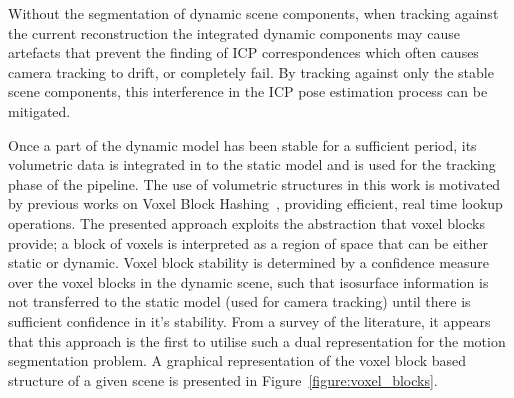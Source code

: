Without the segmentation of dynamic scene components, when tracking against the
current reconstruction the integrated dynamic components may cause artefacts
that prevent the finding of ICP correspondences which often causes camera
tracking to drift, or completely fail. By tracking against only the stable
scene components, this interference in the ICP pose estimation process can be
mitigated.

Once a part of the dynamic model has been stable for a sufficient period, its
volumetric data is integrated in to the static model and is used for the
tracking phase of the pipeline. The use of volumetric structures in this work
is motivated by previous works on Voxel Block Hashing~\cite{NieBner2013},
providing efficient, real time lookup operations. The presented approach
exploits the abstraction that voxel blocks provide; a block of voxels is
interpreted as a region of space that can be either static or dynamic.
Voxel block stability is determined by a confidence measure over the voxel
blocks in the dynamic scene, such that isosurface information is not transferred
to the static model (used for camera tracking) until there is sufficient
confidence in it's stability. From a survey of the literature, it appears that 
this approach is the first to utilise such a dual representation for the motion 
segmentation problem. A graphical representation of the voxel block based structure 
of a given scene is presented in Figure~\ref{figure:voxel_blocks}.
